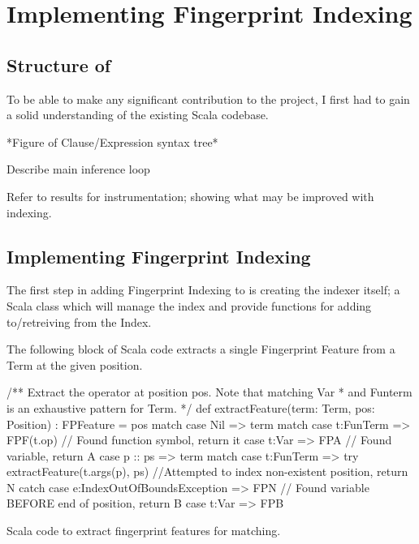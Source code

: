 
\chapter{Implementing Fingerprint Indexing}
\label{cha:method}

\section{Structure of \beagle}
\label{sec:initial}

To be able to make any significant contribution to the \beagle  project, I first
had to gain a solid understanding of the existing Scala codebase.

*Figure of Clause/Expression syntax tree*

Describe main inference loop

Refer to results for instrumentation; showing what may be improved with indexing.

\section{Implementing Fingerprint Indexing}
\label{sec:initial}


The first step in adding Fingerprint Indexing to \beagle is creating the indexer
itself; a Scala class which will manage the index and provide functions for adding
to/retreiving from the Index. 


The following block of Scala code extracts a single Fingerprint Feature from
a Term at the given position.
\begin{listing}[H]
\begin{scalacode}
 /** Extract the operator at position pos. Note that matching Var
   * and Funterm is an exhaustive pattern for Term. */
  def extractFeature(term: Term, pos: Position) : FPFeature = pos match {
    case Nil     => term match {
      case t:FunTerm => FPF(t.op) // Found function symbol, return it
      case t:Var     => FPA       // Found variable, return A
    }
    case p :: ps => term match {
      case t:FunTerm => try   {extractFeature(t.args(p), ps) }
                        //Attempted to index non-existent position, return N
                        catch {case e:IndexOutOfBoundsException => FPN}
      // Found variable BEFORE end of position, return B
      case t:Var     => FPB 
    }
  }
\end{scalacode}
\caption{Scala code to extract fingerprint features for matching.}
\label{lst:posextract}
\end{listing}

